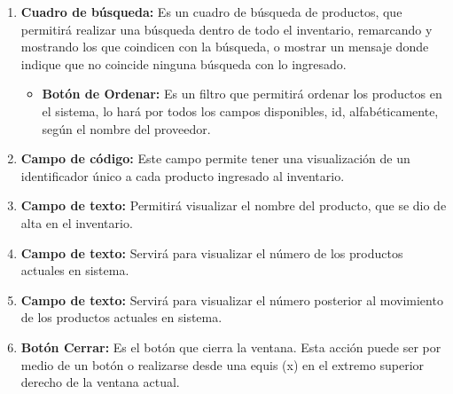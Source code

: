 \documentclass[a4paper,DIV=12]{scrreprt}
\begin{document}
\begin{enumerate}
	\item{\textbf{Cuadro de búsqueda:} Es un cuadro de búsqueda de productos, que permitirá realizar una búsqueda dentro de todo el inventario, remarcando y mostrando los que coindicen con la búsqueda, o mostrar un mensaje donde indique que no coincide ninguna búsqueda con lo ingresado.  }	
	\begin{itemize}
		\item{\textbf{Botón de Ordenar:} Es un filtro que permitirá ordenar los productos en el sistema, lo hará por todos los campos disponibles, id, alfabéticamente, según el nombre del proveedor. }
	\end{itemize}

	\item{\textbf{Campo de código:} Este campo permite tener una visualización de un identificador único a cada producto ingresado al inventario.}	
	\item{\textbf{Campo de texto:} Permitirá visualizar el nombre del producto, que se dio de alta en el inventario.}			
		
		
	\item{\textbf{Campo de texto:} Servirá para visualizar el número de los productos actuales en sistema.}	
	\item{\textbf{Campo de texto:} Servirá para visualizar el número posterior al movimiento de los productos actuales en sistema.}	
	
	\item{\textbf{Botón Cerrar:} Es el botón que cierra la ventana. Esta acción puede ser por medio de un botón o realizarse desde una equis (x) en el extremo superior derecho de la ventana actual.}	
\end{enumerate}
\end{document}
